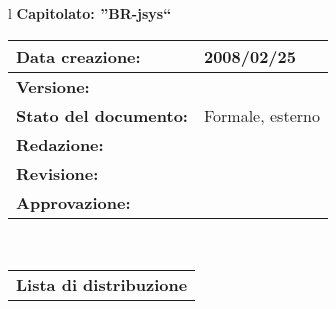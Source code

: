 

\newcommand{\lv}{ 0.3 } %
\newcommand{\Glossario}{} %
\newcommand{\dt}{ Manuale Utente }%

\begin{center}
\thispagestyle{plain}
\begin{table}[htbp]
\large{
\begin{tabular}{l}
\Large{\textbf{\textsf{Capitolato: ''BR-jsys``}}} \\
\begin{tabular}{||p{6cm}||p{6cm}||} \hline
\textbf{Data creazione:} & 2008/02/25 \\ \hline
\textbf{Versione:} & \\ \hline
\textbf{Stato del documento:} & Formale, esterno \\ \hline
\textbf{Redazione:} & \\ \hline
\textbf{Revisione:} & \\ \hline
\textbf{Approvazione:} & \\ \hline
\end{tabular} \\
\end{tabular}
}
\end{table}

\begin{table}[hbtp]
\large{
\begin{tabular}{l}
\Large{\textbf{\textsf{Lista di distribuzione}}} \\


\end{tabular}}
\end{table}
\end{center}
